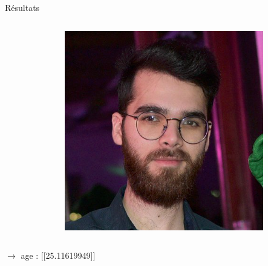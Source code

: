 \documentclass[compress]{beamer}
\begin{document}
\begin{frame}{Résultats}
  \begin{columns}
    \begin{column}{0.6\linewidth}
      \inputminted[fontsize=\scriptsize]{python}{code1.py}
    \end{column}
    \begin{column}{0.4\linewidth}
      \centering
      \includegraphics[width=\linewidth]{resources/Flo}
    \end{column}
  \end{columns}
    $\rightarrow$ age : [[25.11619949]]
\end{frame}
\end{document}
